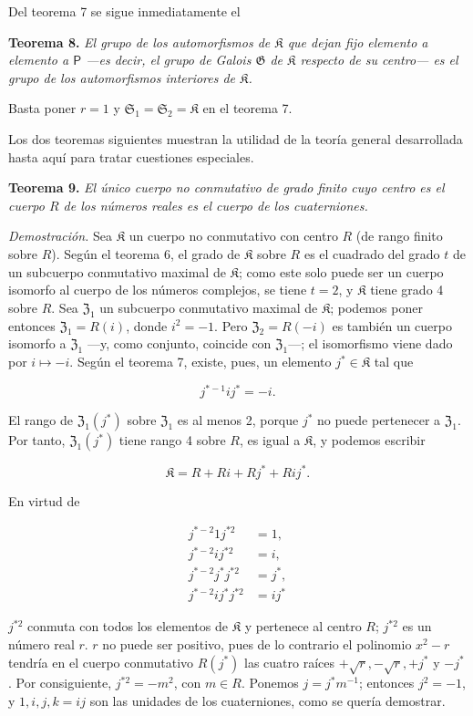 Del teorema 7 se sigue inmediatamente el

\textbf{Teorema 8.} \emph{El grupo de los automorfismos de \(\mathfrak K\) que dejan fijo elemento a elemento a \(\mathsf P\) ---es decir, el grupo de Galois \(\mathfrak G\) de \(\mathfrak K\) respecto de su centro--- es el grupo de los automorfismos interiores de \(\mathfrak K\).}

Basta poner \(r=1\) y \(\mathfrak S_1=\mathfrak S_2=\mathfrak K\) en el teorema 7.

Los dos teoremas siguientes muestran la utilidad de la teoría general desarrollada hasta aquí para tratar cuestiones especiales.

\textbf{Teorema 9.} \emph{El único cuerpo no conmutativo de grado finito cuyo centro es el cuerpo \(R\) de los números reales es el cuerpo de los cuaterniones.}

\emph{Demostración.} Sea \(\mathfrak K\) un cuerpo no conmutativo con centro \(R\) (de rango finito sobre \(R\)). Según el teorema 6, el grado de \(\mathfrak K\) sobre \(R\) es el cuadrado del grado \(t\) de un subcuerpo conmutativo maximal de \(\mathfrak K\); como este solo puede ser un cuerpo isomorfo al cuerpo de los números complejos, se tiene \(t=2\), y \(\mathfrak K\) tiene grado 4 sobre \(R\). Sea \(\mathfrak Z_1\) un subcuerpo conmutativo maximal de \(\mathfrak K\); podemos poner entonces \(\mathfrak Z_1=R(i)\), donde \(i^2=-1\). Pero \(\mathfrak Z_2=R(-i)\) es también un cuerpo isomorfo a \(\mathfrak Z_1\) ---y, como conjunto, coincide con \(\mathfrak Z_1\)---; el isomorfismo viene dado por \(i\mapsto-i\). Según el teorema 7, existe, pues, un elemento \(j^*\in\mathfrak K\) tal que

\[
j^{*-1}ij^*=-i.
\]

El rango de \(\mathfrak Z_1(j^*)\) sobre \(\mathfrak Z_1\) es al menos 2, porque \(j^*\) no puede pertenecer a \(\mathfrak Z_1\). Por tanto, \(\mathfrak Z_1(j^*)\) tiene rango 4 sobre \(R\), es igual a \(\mathfrak K\), y podemos escribir

\[
\mathfrak K=R+Ri+Rj^*+Rij^*.
\]

En virtud de

\[
\begin{aligned}
j^{*-2}1j^{*2}&=1,\\
j^{*-2}ij^{*2}&=i,\\
j^{*-2}j^*j^{*2}&=j^*,\\
j^{*-2}ij^*j^{*2}&=ij^*
\end{aligned}
\]

\(j^{*2}\) conmuta con todos los elementos de \(\mathfrak K\) y pertenece al centro \(R\); \(j^{*2}\) es un número real \(r\). \(r\) no puede ser positivo, pues de lo contrario el polinomio \(x^2-r\) tendría en el cuerpo conmutativo \(R(j^*)\) las cuatro raíces \(+\sqrt r,-\sqrt r,+j^*\) y \(-j^*\). Por consiguiente, \(j^{*2}=-m^2\), con \(m\in R\). Ponemos \(j=j^*m^{-1}\); entonces \(j^2=-1\), y \(1,i,j,k=ij\) son las unidades de los cuaterniones, como se quería demostrar.

